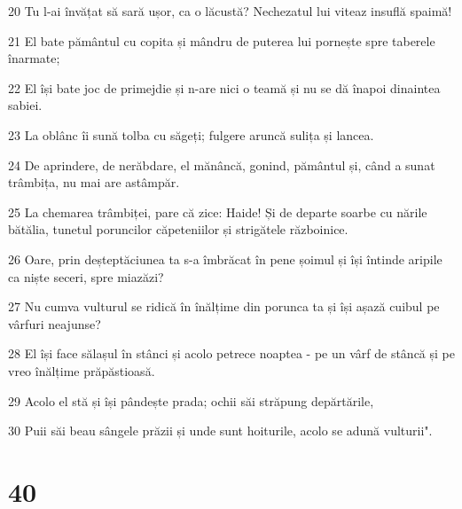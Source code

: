 \par 20 Tu l-ai învățat să sară ușor, ca o lăcustă? Nechezatul lui viteaz insuflă spaimă!
\par 21 El bate pământul cu copita și mândru de puterea lui pornește spre taberele înarmate;
\par 22 El își bate joc de primejdie și n-are nici o teamă și nu se dă înapoi dinaintea sabiei.
\par 23 La oblânc îi sună tolba cu săgeți; fulgere aruncă sulița și lancea.
\par 24 De aprindere, de nerăbdare, el mănâncă, gonind, pământul și, când a sunat trâmbița, nu mai are astâmpăr.
\par 25 La chemarea trâmbiței, pare că zice: Haide! Și de departe soarbe cu nările bătălia, tunetul poruncilor căpeteniilor și strigătele războinice.
\par 26 Oare, prin deșteptăciunea ta s-a îmbrăcat în pene șoimul și își întinde aripile ca niște seceri, spre miazăzi?
\par 27 Nu cumva vulturul se ridică în înălțime din porunca ta și își așază cuibul pe vârfuri neajunse?
\par 28 El își face sălașul în stânci și acolo petrece noaptea - pe un vârf de stâncă și pe vreo înălțime prăpăstioasă.
\par 29 Acolo el stă și își pândește prada; ochii săi străpung depărtările,
\par 30 Puii săi beau sângele prăzii și unde sunt hoiturile, acolo se adună vulturii".

\chapter{40}

